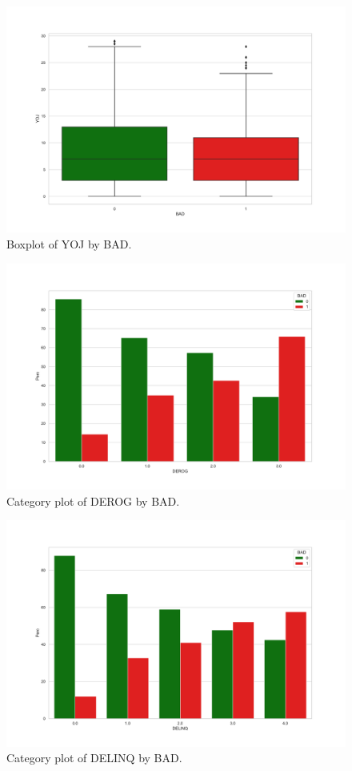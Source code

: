 \begin{figure}[!ht]
	\centering
	\includegraphics[scale=0.40]{figs/yoj_box.pdf}
	\caption{Boxplot of YOJ by BAD. \label{yoj_box}}
\end{figure}

\begin{figure}[!ht]
	\centering
	\includegraphics[scale=0.40]{figs/derog_cat.pdf}
	\caption{Category plot of DEROG by BAD. \label{derog_cat}}
\end{figure}

\begin{figure}[!ht]
	\centering
	\includegraphics[scale=0.40]{figs/delinq_cat.pdf}
	\caption{Category plot of DELINQ by BAD. \label{delinq_cat}}
\end{figure}

